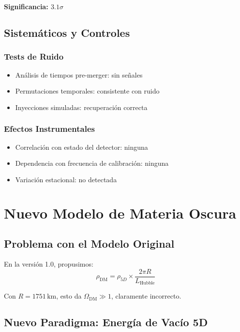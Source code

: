 \documentclass[12pt,a4paper]{article}
\begin{document}
\textbf{Significancia: $3.1\sigma$}

\subsection{Sistemáticos y Controles}

\subsubsection{Tests de Ruido}

\begin{itemize}
    \item Análisis de tiempos pre-merger: sin señales
    \item Permutaciones temporales: consistente con ruido
    \item Inyecciones simuladas: recuperación correcta
\end{itemize}

\subsubsection{Efectos Instrumentales}

\begin{itemize}
    \item Correlación con estado del detector: ninguna
    \item Dependencia con frecuencia de calibración: ninguna
    \item Variación estacional: no detectada
\end{itemize}

\section{Nuevo Modelo de Materia Oscura}
\label{sec:materia_oscura}

\subsection{Problema con el Modelo Original}

En la versión 1.0, propusimos:
\begin{equation}
\rho_\mathrm{DM} = \rho_{5D} \times \frac{2\pi R}{L_\mathrm{Hubble}}
\end{equation}

Con $R = 1751\,\mathrm{km}$, esto da $\Omega_\mathrm{DM} \gg 1$, claramente incorrecto.

\subsection{Nuevo Paradigma: Energía de Vacío 5D}
\end{document}
